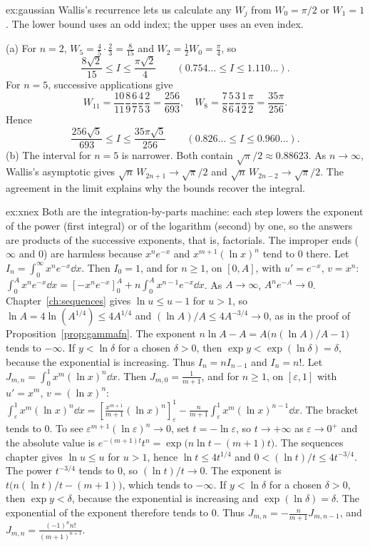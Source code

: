 \begin{solution}{ex:gaussian}
\idea Wallis's recurrence lets us calculate any $W_j$ from $W_0=\pi/2$ or $W_1=1$. The lower bound uses an odd index; the upper uses an even index.

\writeup (a) For $n=2$, $W_5=\frac45\cdot\frac23=\frac8{15}$ and $W_2=\frac12W_0=\frac\pi4$, so
\[
\frac{8\sqrt2}{15}\le I\le\frac{\pi\sqrt2}{4}
\qquad(0.754\ldots\le I\le1.110\ldots).
\]
For $n=5$, successive applications give
\[
W_{11}=\frac{10}{11}\frac89\frac67\frac45\frac23=\frac{256}{693},
\quad
W_8=\frac78\frac56\frac34\frac12\frac\pi2=\frac{35\pi}{256}.
\]
Hence
\[
\frac{256\sqrt5}{693}\le I\le\frac{35\pi\sqrt5}{256}
\qquad(0.826\ldots\le I\le0.960\ldots).
\]
(b) The interval for $n=5$ is narrower. Both contain $\sqrt\pi/2\approx0.88623$. As $n\to\infty$, Wallis's asymptotic gives
$\sqrt n\,W_{2n+1}\to\sqrt\pi/2$ and
$\sqrt n\,W_{2n-2}\to\sqrt\pi/2$.
The agreement in the limit explains why the bounds recover the integral.
\end{solution}


\begin{solution}{ex:xnex}
\idea Both are the integration-by-parts machine: each step lowers the exponent of the power (first integral) or of the logarithm (second) by one, so the answers are products of the successive exponents, that is, factorials. The improper ends ($\infty$ and $0$) are harmless because $x^ne^{-x}$ and $x^{m+1}(\ln x)^n$ tend to $0$ there.
\writeup Let $I_n=\int_0^\infty x^ne^{-x}\dd x$. Then $I_0=1$, and for $n\ge1$, on $[0,A]$, with $u'=e^{-x}$, $v=x^n$: $\int_0^Ax^ne^{-x}\dd x=\left[-x^ne^{-x}\right]_0^A+n\int_0^Ax^{n-1}e^{-x}\dd x$. As $A\to\infty$, $A^ne^{-A}\to0$. Chapter~\ref{ch:sequences} gives $\ln u\le u-1$ for $u>1$, so $\ln A=4\ln(A^{1/4})\le4A^{1/4}$ and $(\ln A)/A\le4A^{-3/4}\to0$, as in the proof of Proposition~\ref{prop:gammafn}. The exponent $n\ln A-A=A\bigl(n(\ln A)/A-1\bigr)$ tends to $-\infty$. If $y<\ln\delta$ for a chosen $\delta>0$, then $\exp y<\exp(\ln\delta)=\delta$, because the exponential is increasing. Thus $I_n=nI_{n-1}$ and $I_n=n!$.
Let $J_{m,n}=\int_0^1x^m(\ln x)^n\dd x$. Then $J_{m,0}=\frac1{m+1}$, and for $n\ge1$, on $[\varepsilon,1]$ with $u'=x^m$, $v=(\ln x)^n$: $\int_\varepsilon^1x^m(\ln x)^n\dd x=\left[\frac{x^{m+1}}{m+1}(\ln x)^n\right]_\varepsilon^1-\frac n{m+1}\int_\varepsilon^1x^m(\ln x)^{n-1}\dd x$. The bracket tends to $0$. To see $\varepsilon^{m+1}(\ln\varepsilon)^n\to0$, set $t=-\ln\varepsilon$, so $t\to+\infty$ as $\varepsilon\to0^+$ and the absolute value is $e^{-(m+1)t}t^n=\exp\bigl(n\ln t-(m+1)t\bigr)$. The sequences chapter gives $\ln u\le u$ for $u>1$, hence $\ln t\le4t^{1/4}$ and $0<(\ln t)/t\le4t^{-3/4}$. The power $t^{-3/4}$ tends to $0$, so $(\ln t)/t\to0$. The exponent is $t\bigl(n(\ln t)/t-(m+1)\bigr)$, which tends to $-\infty$. If $y<\ln\delta$ for a chosen $\delta>0$, then $\exp y<\delta$, because the exponential is increasing and $\exp(\ln\delta)=\delta$. The exponential of the exponent therefore tends to $0$. Thus $J_{m,n}=-\frac n{m+1}J_{m,n-1}$, and $J_{m,n}=\frac{(-1)^nn!}{(m+1)^{n+1}}$.
\end{solution}

